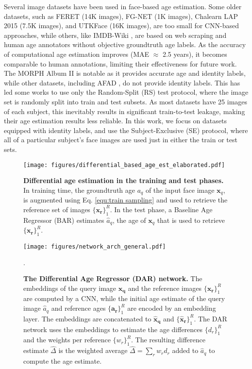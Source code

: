 Several image datasets have been used in face-based age estimation. Some older
datasets, such as FERET \cite{PHILLIPS1998295} (14K images), FG-NET
\cite{cootes2008fg} (1K images), Chalearn LAP 2015
\cite{agustsson2017appareal} (7.5K images), and UTKFace \cite{zhifei2017cvpr}
(16K images), are too small for CNN-based approaches, while others, like
IMDB-Wiki \cite{7406390}, are based on web scraping and human age annotators
without objective groundtruth age labels. As the accuracy of computational age
estimation improves (MAE $\approx$ 2.5 years), it becomes comparable to human
annotations, limiting their effectiveness for future work. The MORPH Album II
\cite{RicanekJr.:2006:MLI:1126250.1126361} is notable as it provides accurate
age and identity labels, while other datasets, including AFAD \cite{7780901},
do not provide identity labels. This has led some works to use only the
Random-Split (RS) test protocol, where the image set is randomly split into
train and test subsets. As most datasets have 25 images of each subject, this
inevitably results in significant train-to-test leakage, making their age
estimation results less reliable. In this work, we focus on datasets equipped
with identity labels, and use the Subject-Exclusive (SE) protocol, where all
of a particular subject's face images are used just in either the train or
test sets.\begin{figure}[tbh]
\begin{center}
\centering\texttt{[image: figures/differential\_based\_age\_est\_elaborated.pdf]}
\end{center}
\caption{\textbf{Differential age estimation in the training and test phases.}
In training time, the groundtruth age $a_{q}$ of the input face image
$\mathbf{x}_{q}$, is augmented using Eq. \ref{equ:train sampling} and used to
retrieve the reference set of images $\{\boldsymbol{x_{r}}\}_{1}^{R}$. In the
test phase, a Baseline Age Regressor (BAR) estimates $\hat{a}_{q}$, the age of
$\mathbf{x}_{q}$ that is used to retrieve $\{\boldsymbol{x_{r}}\}_{1}^{R}$.}%
\label{fig:differential_based_age_est_elaborated}%
\end{figure}\begin{figure*}[tbh]
\begin{center}
\centering\texttt{[image: figures/network\_arch\_general.pdf]}
\end{center}
\par
.\caption{\textbf{The Differential Age Regressor (DAR) network.} The
embeddings of the query image $\boldsymbol{x_{q}}$ and the reference images
$\{\boldsymbol{x_{r}}\}_{1}^{R}$ are computed by a CNN, while the initial age
estimate of the query image $\hat{a}_{q}$ and reference ages
$\{\boldsymbol{a_{r}}\}_{1}^{R}$ are encoded by an embedding layer. The
embeddings are concatenated to $\boldsymbol{{\hat{x}}_{q}}$ and
$\{\boldsymbol{{\hat{x}}_{r}}\}_{1}^{R}$. The DAR network uses the embeddings
to estimate the age differences $\{{d}_{r}\}_{1}^{R}$ and the weights per
reference $\{{w}_{r}\}_{1}^{R}$. The resulting difference estimate
$\hat{\Delta}$ is the weighted average $\hat{\Delta}=\sum_{r}{w}_{r}{d}_{r}$
added to $\hat{a}_{q}$ to compute the age estimate.}%
\label{fig:network_arch_general}%
\end{figure*}